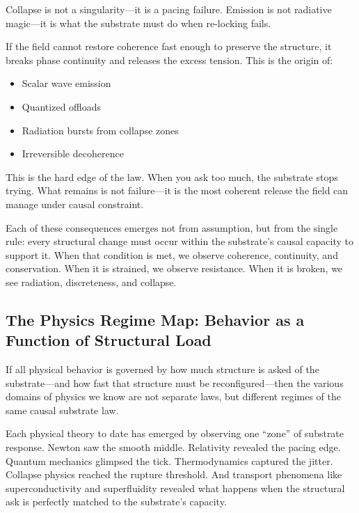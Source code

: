 \documentclass[entropy,article,submit,pdftex,moreauthors]{Definitions/mdpi}
\begin{document}
Collapse is not a singularity—it is a pacing failure. Emission is not radiative magic—it is what the substrate must do when re-locking fails.

If the field cannot restore coherence fast enough to preserve the structure, it breaks phase continuity and releases the excess tension. This is the origin of:

\begin{itemize}
    \item Scalar wave emission
    \item Quantized offloads
    \item Radiation bursts from collapse zones
    \item Irreversible decoherence
\end{itemize}

This is the hard edge of the law. When you ask too much, the substrate stops trying. What remains is not failure—it is the most coherent release the field can manage under causal constraint.

\vspace{1em}

Each of these consequences emerges not from assumption, but from the single rule: every structural change must occur within the substrate’s causal capacity to support it. When that condition is met, we observe coherence, continuity, and conservation. When it is strained, we observe resistance. When it is broken, we see radiation, discreteness, and collapse.
\subsection{The Physics Regime Map: Behavior as a Function of Structural Load}

If all physical behavior is governed by how much structure is asked of the substrate—and how fast that structure must be reconfigured—then the various domains of physics we know are not separate laws, but different regimes of the same causal substrate law.

Each physical theory to date has emerged by observing one “zone” of substrate response. Newton saw the smooth middle. Relativity revealed the pacing edge. Quantum mechanics glimpsed the tick. Thermodynamics captured the jitter. Collapse physics reached the rupture threshold. And transport phenomena like superconductivity and superfluidity revealed what happens when the structural ask is perfectly matched to the substrate's capacity.
\end{document}
